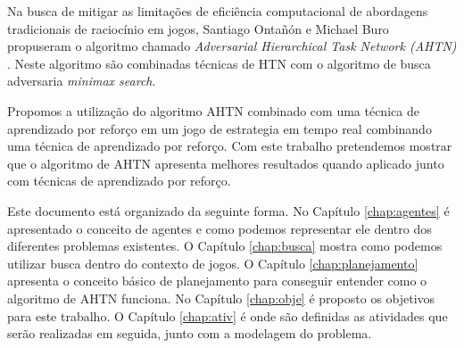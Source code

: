 Na busca de mitigar as limitações de eficiência computacional de abordagens tradicionais de raciocínio em jogos, Santiago Ontañón e Michael Buro propuseram o algoritmo chamado \textit{Adversarial Hierarchical Task Network (AHTN)} \cite{ontanon2015adversarial}. Neste algoritmo são combinadas técnicas de HTN com o algoritmo de busca adversaria \textit{minimax search}. 

Propomos a utilização do algoritmo AHTN combinado com uma técnica de aprendizado por reforço em um jogo de estrategia em tempo real combinando uma técnica de aprendizado por reforço. Com este trabalho pretendemos mostrar que o algoritmo de AHTN apresenta melhores resultados quando aplicado junto com técnicas de aprendizado por reforço.

Este documento está organizado da seguinte forma. No Capítulo \ref{chap:agentes} é apresentado o conceito de agentes e como podemos representar ele dentro dos diferentes problemas existentes. O Capítulo \ref{chap:busca} mostra como podemos utilizar busca dentro do contexto de jogos. O Capítulo \ref{chap:planejamento} apresenta o conceito básico de planejamento para conseguir entender como o algoritmo de AHTN funciona. No Capítulo \ref{chap:obje} é proposto os objetivos para este trabalho. O Capítulo \ref{chap:ativ} é onde são definidas as atividades que serão realizadas em seguida, junto com a modelagem do problema.   
